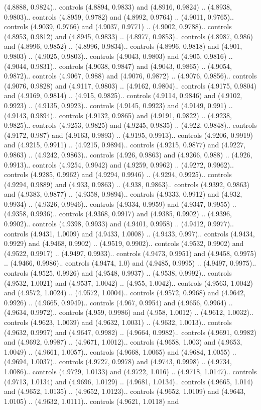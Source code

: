 (4.8888, 0.9824).. controls (4.8894, 0.9833) and (4.8916, 0.9824) .. (4.8938, 0.9803).. controls (4.8959, 0.9782) and (4.8992, 0.9764) .. (4.9011, 0.9765).. controls (4.9039, 0.9766) and (4.9037, 0.9771) .. (4.9002, 0.9788).. controls (4.8953, 0.9812) and (4.8945, 0.9833) .. (4.8977, 0.9853).. controls (4.8987, 0.986) and (4.8996, 0.9852) .. (4.8996, 0.9834).. controls (4.8996, 0.9818) and (4.901, 0.9803) .. (4.9025, 0.9803).. controls (4.9043, 0.9803) and (4.905, 0.9816) .. (4.9044, 0.9831).. controls (4.9038, 0.9847) and (4.9043, 0.9865) .. (4.9054, 0.9872).. controls (4.9067, 0.988) and (4.9076, 0.9872) .. (4.9076, 0.9856).. controls (4.9076, 0.9828) and (4.9117, 0.9803) .. (4.9162, 0.9804).. controls (4.9175, 0.9804) and (4.9169, 0.9814) .. (4.915, 0.9825).. controls (4.9114, 0.9846) and (4.9102, 0.9923) .. (4.9135, 0.9923).. controls (4.9145, 0.9923) and (4.9149, 0.991) .. (4.9143, 0.9894).. controls (4.9132, 0.9865) and (4.9191, 0.9822) .. (4.9238, 0.9825).. controls (4.9253, 0.9825) and (4.9245, 0.9835) .. (4.922, 0.9848).. controls (4.9172, 0.987) and (4.9163, 0.9893) .. (4.9195, 0.9913).. controls (4.9206, 0.9919) and (4.9215, 0.9911) .. (4.9215, 0.9894).. controls (4.9215, 0.9877) and (4.9227, 0.9863) .. (4.9242, 0.9863).. controls (4.926, 0.9863) and (4.9266, 0.988) .. (4.926, 0.9913).. controls (4.9254, 0.9942) and (4.9259, 0.9962) .. (4.9272, 0.9962).. controls (4.9285, 0.9962) and (4.9294, 0.9946) .. (4.9294, 0.9925).. controls (4.9294, 0.9889) and (4.933, 0.9863) .. (4.938, 0.9863).. controls (4.9392, 0.9863) and (4.9383, 0.9877) .. (4.9358, 0.9894).. controls (4.9333, 0.9912) and (4.932, 0.9934) .. (4.9326, 0.9946).. controls (4.9334, 0.9959) and (4.9347, 0.9955) .. (4.9358, 0.9936).. controls (4.9368, 0.9917) and (4.9385, 0.9902) .. (4.9396, 0.9902).. controls (4.9398, 0.9933) and (4.9401, 0.9958) .. (4.9412, 0.9977).. controls (4.9431, 1.0009) and (4.9433, 1.0008) .. (4.9433, 0.997).. controls (4.9434, 0.9929) and (4.9468, 0.9902) .. (4.9519, 0.9902).. controls (4.9532, 0.9902) and (4.9522, 0.9917) .. (4.9497, 0.9933).. controls (4.9473, 0.9951) and (4.9458, 0.9975) .. (4.9466, 0.9986).. controls (4.9474, 1.0) and (4.9485, 0.9995) .. (4.9497, 0.9975).. controls (4.9525, 0.9926) and (4.9548, 0.9937) .. (4.9538, 0.9992).. controls (4.9532, 1.0021) and (4.9537, 1.0042) .. (4.955, 1.0042).. controls (4.9563, 1.0042) and (4.9572, 1.0024) .. (4.9572, 1.0004).. controls (4.9572, 0.9968) and (4.9642, 0.9926) .. (4.9665, 0.9949).. controls (4.967, 0.9954) and (4.9656, 0.9964) .. (4.9634, 0.9972).. controls (4.959, 0.9986) and (4.958, 1.0012) .. (4.9612, 1.0032).. controls (4.9623, 1.0039) and (4.9632, 1.0031) .. (4.9632, 1.0013).. controls (4.9632, 0.9997) and (4.9647, 0.9982) .. (4.9664, 0.9982).. controls (4.9691, 0.9982) and (4.9692, 0.9987) .. (4.9671, 1.0012).. controls (4.9658, 1.003) and (4.9653, 1.0049) .. (4.9661, 1.0057).. controls (4.9668, 1.0065) and (4.9684, 1.0055) .. (4.9694, 1.0037).. controls (4.9727, 0.9978) and (4.9743, 0.9998) .. (4.9734, 1.0086).. controls (4.9729, 1.0133) and (4.9722, 1.016) .. (4.9718, 1.0147).. controls (4.9713, 1.0134) and (4.9696, 1.0129) .. (4.9681, 1.0134).. controls (4.9665, 1.014) and (4.9652, 1.0135) .. (4.9652, 1.0123).. controls (4.9652, 1.0109) and (4.9643, 1.0105) .. (4.9632, 1.0111).. controls (4.9621, 1.0118) and 